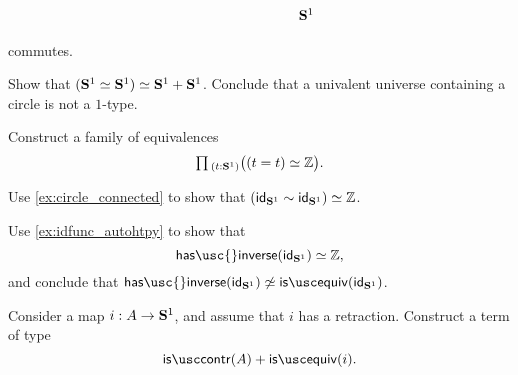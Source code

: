 \begin{exercises}
\begin{subexenum}
\begin{equation*}
\begin{tikzcd}[column sep=tiny]
\phantom{\sm{t:\sphere{1}}\mathcal{T}(t)} & \sphere{1}
\end{tikzcd}
\end{equation*}
commutes.
\end{subexenum}
\exercise Show that $\eqv{(\eqv{\sphere{1}}{\sphere{1}})}{\sphere{1}+\sphere{1}}$. Conclude that a univalent universe containing a circle is not a $1$-type.
\exercise \label{ex:is_invertible_id_S1}
\begin{subexenum}
\item Construct a family of equivalences
\begin{equation*}
\prd{t:\sphere{1}} \big(\eqv{(t=t)}{\Z}\big).
\end{equation*}
\item Use \cref{ex:circle_connected} to show that $\eqv{(\idfunc[\sphere{1}]\htpy\idfunc[\sphere{1}])}{\Z}$.
\item Use \cref{ex:idfunc_autohtpy} to show that
\begin{equation*}
\eqv{\mathsf{has\usc{}inverse}(\idfunc[\sphere{1}])}{\Z},
\end{equation*}
and conclude that ${\mathsf{has\usc{}inverse}}(\idfunc[\sphere{1}])\not\simeq{\isequiv(\idfunc[\sphere{1}])}$. 
\end{subexenum}
\exercise Consider a map $i:A \to \mathbf{S}^{1}$, and assume that $i$ has a retraction. Construct a term of type
  \begin{equation*}
    \iscontr(A)+\isequiv(i).
  \end{equation*}
\end{exercises}

